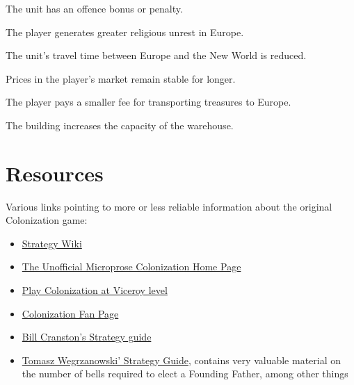 \documentclass[12pt]{book}
\begin{document}
The unit has an offence bonus or penalty.

\affectsPlayer

The player generates greater religious unrest in Europe.

\affectsUnit

The unit's travel time between Europe and the New World is reduced.

\affectsPlayer

Prices in the player's market remain stable for longer.

\affectsPlayer

The player pays a smaller fee for transporting treasures to Europe.

\affectsBuilding

The building increases the capacity of the warehouse.


\hypertarget{Resources}{\chapter{Resources}}

Various links pointing to more or less reliable information about the
original Colonization game:

\begin{itemize}
\item \href{http://strategywiki.org/wiki/Sid_Meier%27s_Colonization}
  {Strategy Wiki}
\item \href{http://www.colonization.biz/}{The Unofficial Microprose
  Colonization Home Page}
\item \href{http://dledgard0.tripod.com/FAQs/play_col_at_viceroy.htm}
  {Play Colonization at Viceroy level}
\item \href{http://www.colonizationfans.com/}{Colonization Fan Page}
\item \href{http://www.ibiblio.org/GameBytes/issue21/misc/colstrat.html}
  {Bill Cranston's Strategy guide}
\item \href{http://civilization.wikia.com/wiki/Colonization_tips}
  {Tomasz Wegrzanowski' Strategy Guide}, contains very valuable
  material on the number of bells required to elect a Founding Father,
  among other things
\end{itemize}


\printindex
\end{document}
